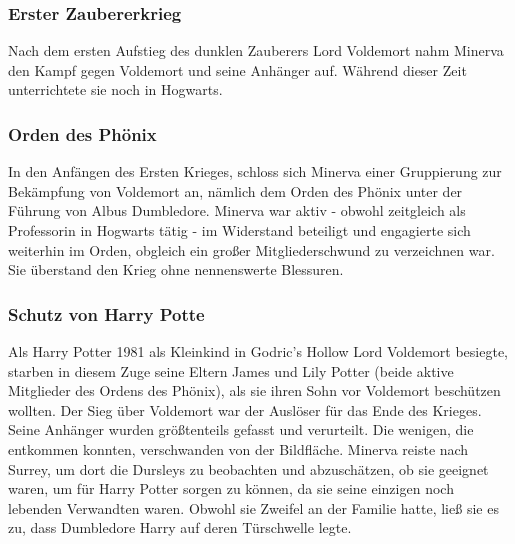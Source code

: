 \documentclass[a4paper, 10pt]{article}
\begin{document}
\subsubsection*{\large Erster Zaubererkrieg}
Nach dem ersten Aufstieg des dunklen Zauberers Lord Voldemort nahm Minerva den Kampf gegen Voldemort und seine Anhänger auf. Während dieser Zeit unterrichtete sie noch in Hogwarts.
\subsubsection*{\large Orden des Phönix}
In den Anfängen des Ersten Krieges, schloss sich Minerva einer Gruppierung zur Bekämpfung von Voldemort an, nämlich dem Orden des Phönix unter der Führung von Albus Dumbledore. Minerva war aktiv - obwohl zeitgleich als Professorin in Hogwarts tätig -  im Widerstand beteiligt und engagierte sich weiterhin im Orden, obgleich ein großer Mitgliederschwund zu verzeichnen war. Sie überstand den Krieg ohne nennenswerte Blessuren.
\subsubsection*{\large Schutz von Harry Potte}
Als Harry Potter 1981 als Kleinkind in Godric's Hollow Lord Voldemort besiegte, starben in diesem Zuge seine Eltern James und Lily Potter (beide aktive Mitglieder des Ordens des Phönix), als sie ihren Sohn vor Voldemort beschützen wollten. Der Sieg über Voldemort war der Auslöser für das Ende des Krieges. Seine Anhänger wurden größtenteils gefasst und verurteilt. Die wenigen, die entkommen konnten, verschwanden von der Bildfläche. Minerva reiste nach Surrey, um dort die Dursleys  zu beobachten und abzuschätzen, ob sie geeignet waren, um für Harry Potter sorgen zu können, da sie seine einzigen noch lebenden Verwandten waren. Obwohl sie Zweifel an der Familie hatte, ließ sie es zu, dass Dumbledore Harry auf deren Türschwelle legte.
\end{document}
